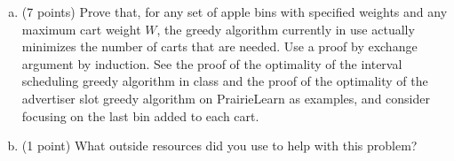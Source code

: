\documentclass[11pt]{article}
\begin{document}
\begin{enumerate}
\begin{enumerate}[(a)]
    \item (7 points)
Prove that, for any set of apple bins with specified weights and any maximum
cart weight $W$, the greedy
algorithm currently in use actually minimizes the number of carts that are
needed. Use a proof by exchange argument by induction. See the proof of the
optimality of the interval scheduling greedy algorithm in class and the proof
of the optimality of the advertiser slot greedy algorithm on PrairieLearn as examples,
and consider focusing on the last bin added to each cart.

\item (1 point) What outside resources did you use to help with this problem?
\end{enumerate}

\end{enumerate}
    
\end{document}
